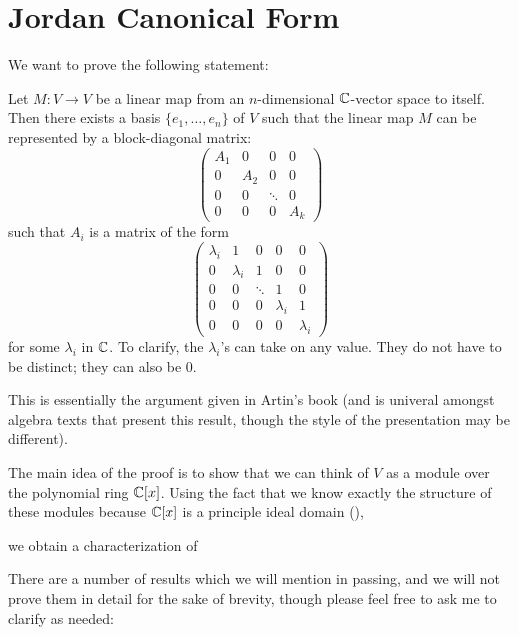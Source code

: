 \section{Jordan Canonical Form}

We want to prove the following statement: 

\begin{thm}
Let $M : V \to V$ be a linear map from an $n$-dimensional 
$\mathbb{C}$-vector space to itself. Then there exists a basis 
$\{e_1,\dots,e_n\}$ of $V$ such that the linear map $M$
can be represented by a block-diagonal matrix:
\[
\left(
\begin{matrix}
A_1 &0   & 0     &0 \\
0   &A_2 & 0     &0 \\
0   &0   &\ddots &0 \\
0   &0   &0      &A_k
\end{matrix}
\right)
\]
such that $A_i$ is a matrix of the form
\[
\left(
\begin{matrix}
\lambda_i & 1         & 0      & 0         & 0 \\
0         & \lambda_i & 1      & 0         & 0 \\
0         & 0         & \ddots & 1         & 0 \\
0         & 0         & 0      & \lambda_i & 1 \\
0         & 0         & 0      & 0         & \lambda_i
\end{matrix}
\right)
\]
for some $\lambda_i$ in $\mathbb{C}$. To clarify, the $\lambda_i$'s can 
take on any value. They do not have to be distinct; they can also
be 0.
\end{thm}

This is essentially the argument given in Artin's book (and is
univeral amongst algebra texts that present this result, though 
the style of the presentation may be different).

The main idea of the proof is to show that we can think of $V$
as a module over the polynomial ring $\mathbb{C}[x]$. Using the fact
that we know exactly the structure of these modules because
$\mathbb{C}[x]$ is a principle ideal domain (), 

we obtain
a characterization of

There are a number of results which we will mention in passing, 
and we will not prove them in detail for the sake of brevity, 
though please feel free to ask me to clarify as needed:

